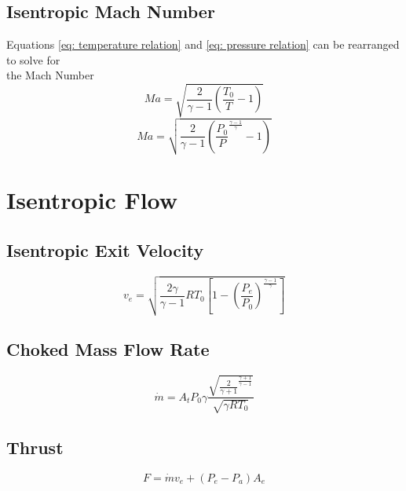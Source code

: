 \documentclass{article}
\numberwithin{equation}{section}
\begin{document}
\subsection{Isentropic Mach Number}
Equations \eqref{eq: temperature relation} and \eqref{eq: pressure relation} can be rearranged to solve for \\
the Mach Number
\begin{equation} \label{1.6a}
    Ma = \sqrt{\frac{2}{\gamma - 1} \left(\frac{T_0}{T} - 1\right)}
\end{equation}
\begin{equation} \label{1.6b}
    Ma = \sqrt{\frac{2}{\gamma - 1} \left(\frac{P_0}{P} ^ {\frac{\gamma - 1}{\gamma}} - 1\right)}
\end{equation}


\pagebreak

\section[Isentropic Flow]{Isentropic Flow\hfil\cite{RPE}}

\subsection{Isentropic Exit Velocity}
\begin{equation} \label{eq: exit velocity}
    v_e = \sqrt{\frac{2 \gamma}{\gamma - 1} R T_0 \left[1 - \left(\frac{P_e}{P_0}\right) ^ {\frac{\gamma - 1}{\gamma}}\right]}
\end{equation}

\subsection{Choked Mass Flow Rate}
\begin{equation} \label{eq: mass flow}
    \dot{m} = A_t P_0 \gamma \frac{\sqrt{\frac{2}{\gamma + 1} ^ {\frac{\gamma + 1}{\gamma - 1}}}}{\sqrt{\gamma R T_0}}
\end{equation}

\subsection{Thrust}
\begin{equation} \label{eq: thrust}
    F = \dot{m} v_e + \left(P_e - P_a\right) A_e
\end{equation}


\pagebreak



\end{document}
